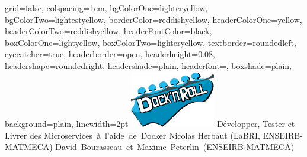 \documentclass[portrait,final,a0paper]{baposter}
\begin{document}
\newlength{\leftimgwidth}
\begin{poster}%
  {
  grid=false,
  colspacing=1em,
  bgColorOne=lighteryellow,
  bgColorTwo=lightestyellow,
  borderColor=reddishyellow,
  headerColorOne=yellow,
  headerColorTwo=reddishyellow,
  headerFontColor=black,
  boxColorOne=lightyellow,
  boxColorTwo=lighteryellow,
  textborder=roundedleft,
  eyecatcher=true,
  headerborder=open,
  headerheight=0.08\textheight,
  headershape=roundedright,
  headershade=plain,
  headerfont=\Large\textsf, %
  boxshade=plain,
  background=plain,
  linewidth=2pt
  }
  {\includegraphics[width=10em]{docknroll}} %
  {\sf %
   Développer, Tester et Livrer des \mbox{Microservices à l'aide de Docker}}
  {\sf %
  \vspace{0.5em}
  Nicolas Herbaut (LaBRI, ENSEIRB-MATMECA) \mbox{David Bourasseau et Maxime Peterlin (ENSEIRB-MATMECA)}
  }
  {%
    
}
\end{poster}
\end{document}
